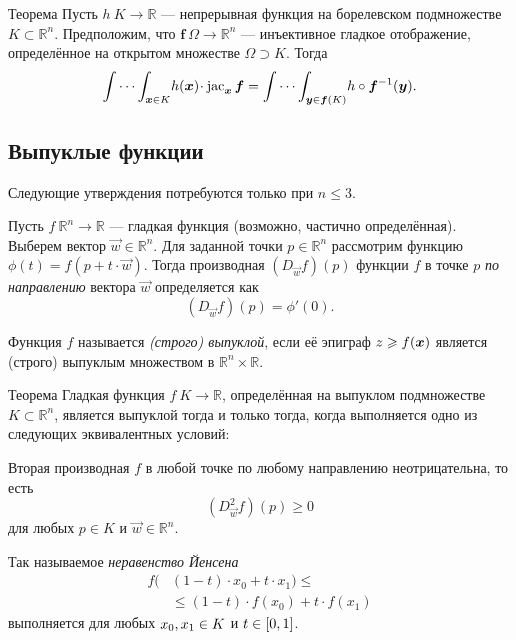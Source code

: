 \begin{multicols}{2}
{\begin{thm}{Теорема}\label{thm:mult-substitution} 
Пусть $h\:K\to\mathbb{R}$ --- непрерывная функция на борелевском подмножестве $K\subset \mathbb{R}^n$.
Предположим, что $\bm{f}\:\Omega\to \mathbb{R}^n$ --- инъективное гладкое отображение, определённое на открытом множестве $\Omega\supset K$.
Тогда
\[\idotsint_{\bm{x}\in K} \!h(\bm{x})\cdot \jac_{\bm{x}}\bm{f}
=
\idotsint_{\bm{y}\in \bm{f}(K)} \!h\circ \bm{f}^{-1}(\bm{y}).\]

\end{thm}

\subsection*{Выпуклые функции}

Следующие утверждения потребуются только при $n\le 3$.

Пусть $f\:\mathbb{R}^n\to \mathbb{R}$ --- гладкая функция (возможно, частично определённая).
Выберем вектор $\vec w\in \mathbb{R}^n$.
Для заданной точки $p\in\mathbb{R}^n$ рассмотрим функцию $\phi(t)=f(p+t\cdot \vec w)$.
Тогда производная $(D_{\vec w}f)(p)$ функции $f$ в точке $p$ \emph{по направлению} вектора $\vec w$ определяется как
\[(D_{\vec w}f)(p)=\phi'(0).\]

Функция $f$ называется \emph{(строго) выпуклой}, если её эпиграф $z\z\ge f(\bm{x})$ является (строго) выпуклым множеством в $\mathbb{R}^n\times \mathbb{R}$.

\begin{thm}{Теорема}\label{thm:Jensen}
Гладкая функция $f\:K\to \mathbb{R}$, определённая на выпуклом подмножестве $K\subset\mathbb{R}^n$, является выпуклой тогда и только тогда, когда выполняется одно из следующих эквивалентных условий:

\begin{subthm}{}
Вторая производная $f$ в любой точке по любому направлению неотрицательна, то есть
\[(D_{\vec w}^2f)(p)\ge 0\]
для любых $p\in K$ и $\vec w\in\mathbb{R}^n$.
\end{subthm}

\begin{subthm}{}
Так называемое \emph{неравенство Йенсена}
\begin{align*}
f (&(1-t)\cdot x_0 + t\cdot x_1 ) \le
\\
&\le (1-t)\cdot f(x_0)+ t\cdot f(x_1)
\end{align*}
выполняется для любых $x_0,x_1\z\in K$ и $t\z\in[0,1]$.


\end{subthm}
\end{thm}}
\end{multicols}
